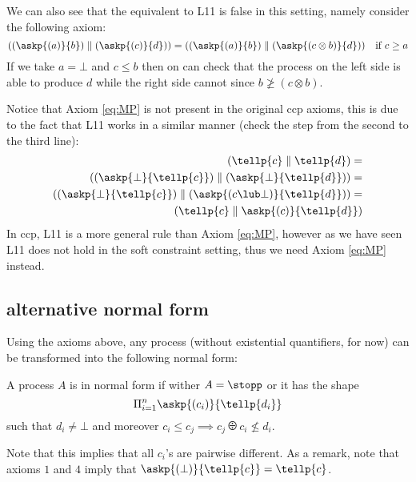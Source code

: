 \documentclass[festschrift13.tex]{subfiles}
\begin{document}
We can also see that the equivalent to L11 is false in this setting, namely consider the following axiom:
\begin{equation} \label{eq:wrongMP}
((\askp{(a)}{b}) \parallel (\askp{(c)}{d})) = ((\askp{(a)}{b}) \parallel (\askp{(c \otimes b)}{d})) \mbox{\ \ \ if } c \geq a
\end{equation}
If we take $a = \bot$ and $c \leq b$ then on can check that the process on the left side is able to produce $d$
while the right side cannot since $b \not\geq (c \otimes b)$.

Notice that Axiom \ref{eq:MP} is not present in the original ccp axioms, this is due to the fact
that L11 works in a similar manner (check the step from the second to the third line):
\begin{equation}
\begin{split}
(\tellp{c} \parallel \tellp{d}) = \\
((\askp{\bot}{\tellp{c}}) \parallel (\askp{\bot}{\tellp{d}})) = \\
((\askp{\bot}{\tellp{c}}) \parallel (\askp{(c \lub \bot)}{\tellp{d}})) = \\
(\tellp{c} \parallel \askp{(c)}{\tellp{d}})
\end{split}
\end{equation}
In ccp, L11 is a more general rule than Axiom \ref{eq:MP}, however as we have seen
L11 does not hold in the soft constraint setting, thus we need Axiom \ref{eq:MP} instead.

\subsection{alternative normal form}
Using the axioms above, any process (without existential quantifiers, for now) can be
transformed into the following normal form:
\begin{definition}
A process $A$ is in normal form if wither $A = \stopp$ or it has the shape
\[ \Pi_{i=1}^n \askp{(c_i)}{\tellp{d_i}} \]
such that $d_i \neq \bot$ and moreover $c_i \leq c_j \implies c_j \odiv c_i \not \leq d_i$.
\end{definition}

Note that this implies that all $c_i$'s are pairwise different. As a remark, note that axioms $1$ and $4$ imply that
$\askp{(\bot)}{\tellp{c}} = \tellp{c}$.
\end{document}
